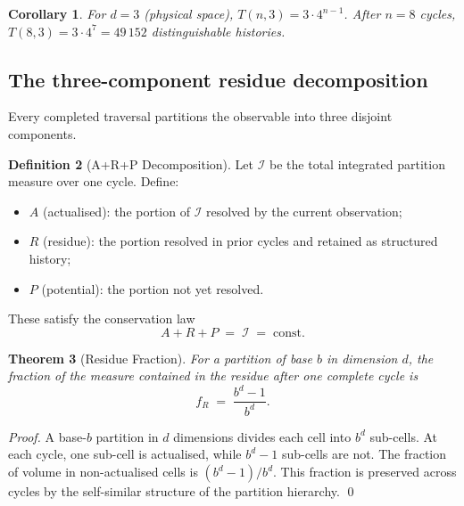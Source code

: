 \documentclass[11pt,twocolumn,a4paper]{article}
\theoremstyle{plain}
\newtheorem{theorem}{Theorem}[section]
\newtheorem{corollary}[theorem]{Corollary}
\theoremstyle{definition}
\newtheorem{definition}[theorem]{Definition}
\theoremstyle{remark}
\begin{document}
\begin{corollary}
For $d=3$ (physical space), $T(n,3)=3\cdot 4^{n-1}$. After $n=8$ cycles, $T(8,3)=3\cdot 4^7=49\,152$ distinguishable histories.
\end{corollary}

\subsection{The three-component residue decomposition}

Every completed traversal partitions the observable into three disjoint components.

\begin{definition}[A+R+P Decomposition]
\label{def:arp}
Let $\mathcal{I}$ be the total integrated partition measure over one cycle. Define:
\begin{itemize}[noitemsep]
  \item $A$ (actualised): the portion of $\mathcal{I}$ resolved by the current observation;
  \item $R$ (residue): the portion resolved in prior cycles and retained as structured history;
  \item $P$ (potential): the portion not yet resolved.
\end{itemize}
These satisfy the conservation law
\begin{equation}
\label{eq:arp}
  A + R + P \;=\; \mathcal{I} \;=\; \text{const}.
\end{equation}
\end{definition}

\begin{theorem}[Residue Fraction]
\label{thm:residue-fraction}
For a partition of base $b$ in dimension $d$, the fraction of the measure contained in the residue after one complete cycle is
\begin{equation}
\label{eq:residue-fraction}
  f_R \;=\; \frac{b^d - 1}{b^d}.
\end{equation}
\end{theorem}

\begin{proof}
A base-$b$ partition in $d$ dimensions divides each cell into $b^d$ sub-cells. At each cycle, one sub-cell is actualised, while $b^d-1$ sub-cells are not. The fraction of volume in non-actualised cells is $(b^d-1)/b^d$. This fraction is preserved across cycles by the self-similar structure of the partition hierarchy. \qed
\end{proof}
\end{document}

